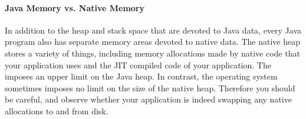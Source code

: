 \paragraph{Java Memory vs. Native Memory}
In addition to the heap and stack space that are devoted to Java data, every
Java program also has separate memory areas devoted to native data. The native
heap stores a variety of things, including memory allocations made by native
code that your application uses and the JIT compiled code of your application.
The \jre imposes an upper limit on the Java heap. In contrast, the operating
system sometimes imposes no limit on the size of the native heap. Therefore you
should be careful, and observe whether your application is indeed swapping any
native allocations to and from disk.

